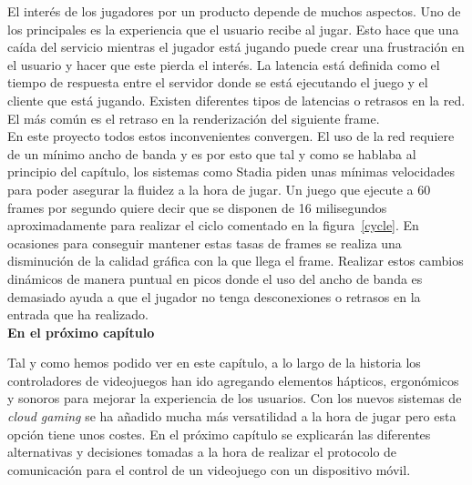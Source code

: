 El inter\'es de los jugadores por un producto depende de muchos aspectos. Uno de los principales es la experiencia que el usuario recibe al jugar. Esto hace que una ca\'ida del servicio mientras el jugador est\'a jugando puede crear una frustraci\'on en el usuario y hacer que este pierda el inter\'es. La latencia est\'a definida como el tiempo de respuesta entre el servidor donde se est\'a ejecutando el juego y el cliente que est\'a jugando. Existen diferentes tipos de latencias o retrasos en la red. El m\'as com\'un es el retraso en la renderizaci\'on del siguiente frame. \\

En este proyecto todos estos inconvenientes convergen. El uso de la red requiere de un m\'inimo ancho de banda y es por esto que tal y como se hablaba al principio del cap\'itulo, los sistemas como Stadia piden unas m\'inimas velocidades para poder asegurar la fluidez a la hora de jugar. Un juego que ejecute a 60 frames por segundo quiere decir que se disponen de 16 milisegundos aproximadamente para realizar el ciclo comentado en la figura~\ref{cycle}. En ocasiones para conseguir mantener estas tasas de frames se realiza una disminuci\'on de la calidad gr\'afica con la que llega el frame. Realizar estos cambios din\'amicos de manera puntual en picos donde el uso del ancho de banda es demasiado ayuda a que el jugador no tenga desconexiones o retrasos en la entrada que ha realizado.\\

\bigskip
\Large{\textbf{En el pr\'oximo cap\'itulo}}\\
\normalsize

Tal y como hemos podido ver en este cap\'itulo, a lo largo de la historia los controladores de videojuegos han ido agregando elementos h\'apticos, ergon\'omicos y sonoros para mejorar la experiencia de los usuarios. Con los nuevos sistemas de \textit{cloud gaming} se ha a\~nadido mucha m\'as versatilidad a la hora de jugar pero esta opci\'on tiene unos costes. En el pr\'oximo cap\'itulo se explicar\'an las diferentes alternativas y decisiones tomadas a la hora de realizar el protocolo de comunicaci\'on para el control de un videojuego con un dispositivo m\'ovil.




